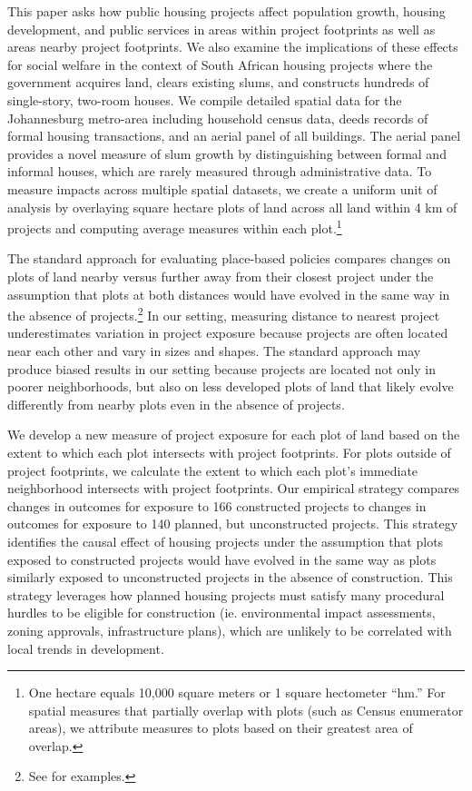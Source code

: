 \documentclass[12pt]{article}
\begin{document}
This paper asks how public housing projects affect population growth, housing development, and public services in areas within project footprints as well as areas nearby project footprints.  We also examine the implications of these effects for social welfare in the context of South African housing projects where the government acquires land, clears existing slums, and constructs hundreds of single-story, two-room houses.  We compile detailed spatial data for the Johannesburg metro-area including household census data, deeds records of formal housing transactions, and an aerial panel of all buildings.  The aerial panel provides a novel measure of slum growth by distinguishing between formal and informal houses, which are rarely measured through administrative data.  To measure impacts across multiple spatial datasets, we create a uniform unit of analysis by overlaying square hectare plots of land across all land within 4 km of projects and computing average measures within each plot.\footnote{One hectare equals 10,000 square meters or 1 square hectometer ``hm.''  For spatial measures that partially overlap with plots (such as Census enumerator areas), we attribute measures to plots based on their greatest area of overlap.}

The standard approach for evaluating place-based policies compares changes on plots of land nearby versus further away from their closest project under the assumption that plots at both distances would have evolved in the same way in the absence of projects.\footnote{See \cite{diamond2016wants,rossi2010housing,hornbeck2017creative} for examples.}  In our setting, measuring distance to nearest project underestimates variation in project exposure because projects are often located near each other and vary in sizes and shapes.  The standard approach may produce biased results in our setting because projects are located not only in poorer neighborhoods, but also on less developed plots of land that likely evolve differently from nearby plots even in the absence of projects.

We develop a new measure of project exposure for each plot of land based on the extent to which each plot intersects with project footprints.  For plots outside of project footprints, we calculate the extent to which each plot's immediate neighborhood intersects with project footprints.  Our empirical strategy compares changes in outcomes for exposure to 166 constructed projects to changes in outcomes for exposure to 140 planned, but unconstructed projects.  This strategy identifies the causal effect of housing projects under the assumption that plots exposed to constructed projects would have evolved in the same way as plots similarly exposed to unconstructed projects in the absence of construction.  This strategy leverages how planned housing projects must satisfy many procedural hurdles to be eligible for construction (ie. environmental impact assessments, zoning approvals, infrastructure plans), which are unlikely to be correlated with local trends in development.
\end{document}

